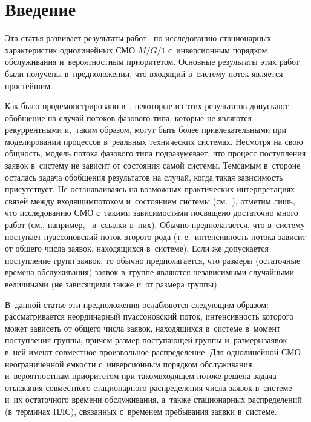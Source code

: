 




\thispagestyle{headings}

\begin{multicols}{2}

\label{st\stat}

\section{Введение}

Эта статья развивает результаты работ~\cite{n0,n1,n2,n3,n4,n5} по исследованию
стационарных характеристик однолинейных СМО
$M/G/1$ с~инверсионным порядком обслуживания и~вероятностным приоритетом.
Основные результаты этих работ были получены в~предположении, что входящий в~систему поток
является простейшим. 

Как было продемонстрировано в~\cite{nm1},
некоторые из этих результатов допускают обобщение на случай
потоков фазового типа, которые не являются рекуррентными и,~таким образом,
могут быть более привлекательными при моделировании процессов в~реальных технических системах.
Несмотря на свою общность, модель потока фазового типа
подразумевает, что процесс поступления заявок в~сис\-те\-му не зависит от состояния самой системы.
Тем\linebreak самым в~стороне осталась задача обобщения результатов на случай,
когда такая зависимость присутствует.
Не останавливаясь на возможных практических интерпретациях
связей между входящим\linebreak потоком и~состоянием системы (см.~\cite{gg2}),
 отметим лишь, что исследованию СМО с~такими зависимостями посвящено достаточно много работ
(см., например,~\cite{gg1,gg3,gg4,gg5} и~ссылки в~них). Обычно
предполагается, что в~систему поступает пуассоновский поток второго рода
(т.\,е.\ интенсивность потока зависит от общего числа заявок, находящихся в~сис\-те\-ме). 
Если же
допускается поступление групп заявок, то обычно предполагается, что размеры (остаточные времена обслуживания)
заявок в~группе являются независимыми случайными величинами (не зависящими также и~от размера группы).

В~данной статье эти предположения ослабляются следующим образом:
рассматривается неординарный пуассоновский поток,
интенсивность которого может зависеть от общего числа заявок, находящих\-ся
в~системе в~момент поступления группы, причем
размер  поступающей группы и~размеры\linebreak заявок в~ней имеют совместное произвольное распределение.
Для однолинейной СМО неограниченной емкости с~инверсионным порядком обслуживания 
и~вероятностным приоритетом при таком\linebreak входя\-щем потоке
решена задача отыскания совместного стационарного
распределения числа заявок в~сис\-те\-ме и~их остаточного времени обслуживания,
а~также стационарных распределений (в~терминах ПЛС),
связанных с~временем пребывания заявки в~системе.


\end{multicols}
